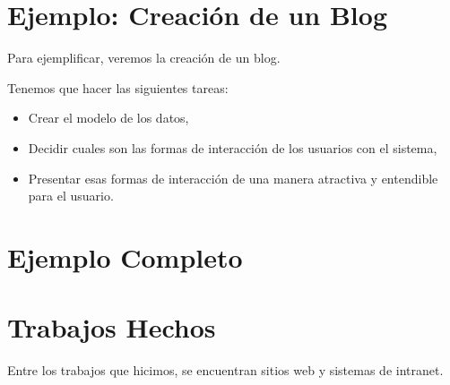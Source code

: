 \documentclass[a4paper,10pt]{article}
\begin{document}
\section{Ejemplo: Creación de un Blog}
Para ejemplificar, veremos la creación de un blog.

Tenemos que hacer las siguientes tareas:
\begin{itemize}
\item Crear el modelo de los datos,
\item Decidir cuales son las formas de interacción de los usuarios con el sistema,
\item Presentar esas formas de interacción de una manera atractiva y entendible para el usuario.
\end{itemize}


\section{Ejemplo Completo}
\section{Trabajos Hechos}
Entre los trabajos que hicimos, se encuentran sitios web y sistemas de intranet.

\end{document}
